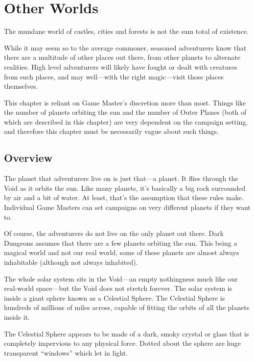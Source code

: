 \chapter[green]{Other Worlds}
\label{chap:Other Worlds}
\thispagestyle{plain}

\begin{multicols*}{2}
The mundane world of castles, cities and forests is not the sum total of existence.

While it may seem so to the average commoner, seasoned adventurers know that there are a multitude of other places out there, from other planets to alternate realities. High level adventurers will likely have fought or dealt with creatures from such places, and may well—with the right magic—visit those places themselves.

This chapter is reliant on Game Master’s discretion more than most. Things like the number of planets orbiting the sun and the number of Outer Planes (both of which are described in this chapter) are very dependent on the campaign setting, and therefore this chapter must be necessarily vague about such things.

\section{Overview}
The planet that adventurers live on is just that—a planet. It flies through the Void as it orbits the sun. Like many planets, it’s basically a big rock surrounded by air and a bit of water. At least, that’s the assumption that these rules make. Individual Game Masters can set campaigns on very different planets if they want to.

Of course, the adventurers do not live on the only planet out there. Dark Dungeons assumes that there are a few planets orbiting the sun. This being a magical world and not our real world, some of these planets are almost always inhabitable (although not always inhabited).

The whole solar system sits in the Void—an empty nothingness much like our real-world space—but the Void does not stretch forever. The solar system is inside a giant sphere known as a Celestial Sphere. The Celestial Sphere is hundreds of millions of miles across, capable of fitting the orbits of all the planets inside it.

The Celestial Sphere appears to be made of a dark, smoky crystal or glass that is completely impervious to any physical force. Dotted about the sphere are huge transparent “windows” which let in light.


\end{multicols*}
